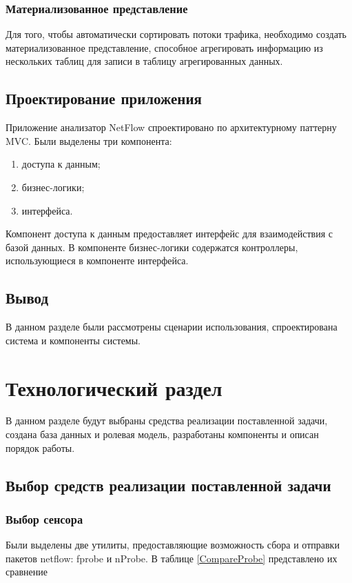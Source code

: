 \subsubsection{Материализованное представление}
Для того, чтобы автоматически сортировать потоки трафика, необходимо создать материализованное представление, способное агрегировать информацию из нескольких таблиц для записи в таблицу агрегированных данных.

\subsection{Проектирование приложения}
Приложение анализатор NetFlow спроектировано по архитектурному паттерну MVC.
Были выделены три компонента:
\begin{enumerate}
	\item доступа к данным;
	\item бизнес-логики;
	\item интерфейса.
\end{enumerate}
\indent \indent Компонент доступа к данным предоставляет интерфейс для взаимодействия с базой данных. В компоненте бизнес-логики содержатся контроллеры, использующиеся в компоненте интерфейса.
\subsection{Вывод}
В данном разделе были рассмотрены сценарии использования, спроектирована система и компоненты системы.

\newpage
\section{Технологический раздел}

В данном разделе будут выбраны средства реализации поставленной задачи, создана база данных и ролевая модель, разработаны компоненты и описан порядок работы.

\subsection{Выбор средств реализации поставленной задачи}
\subsubsection{Выбор сенсора}
Были выделены две утилиты, предоставляющие возможность сбора и отправки пакетов netflow: fprobe и nProbe. В таблице \ref{CompareProbe} представлено их сравнение

